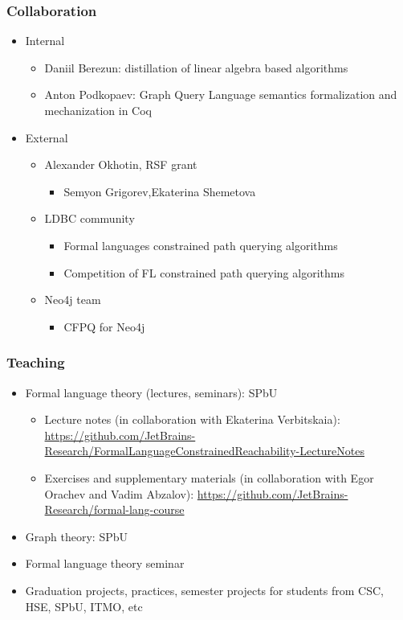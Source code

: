 \documentclass[xcolor=table, aspectratio=169]{beamer}
\begin{document}
\begin{frame}[fragile]

  \frametitle{Collaboration}
\begin{itemize}
      \item Internal
      \begin{itemize}
        \item Daniil Berezun: distillation of linear algebra based algorithms
        \item Anton Podkopaev: Graph Query Language semantics formalization and mechanization in Coq
      \end{itemize}
      \item External
      \begin{itemize}
      \item Alexander Okhotin, RSF grant 
      \begin{itemize}
        \item Semyon Grigorev,Ekaterina Shemetova
      \end{itemize}
      \item LDBC community
      \begin{itemize}
        \item Formal languages constrained path querying algorithms
        \item Competition of FL constrained path querying algorithms 
      \end{itemize}
      \item Neo4j team
      \begin{itemize}
        \item CFPQ for Neo4j
      \end{itemize}
    \end{itemize}

\end{itemize}
\end{frame}

\begin{frame}[fragile]

  \frametitle{Teaching}
\begin{itemize}
      \item Formal language theory (lectures, seminars): SPbU
        \begin{itemize}
          \item [\faGears] Lecture notes (in collaboration with Ekaterina Verbitskaia): \url{https://github.com/JetBrains-Research/FormalLanguageConstrainedReachability-LectureNotes} 
          \item [\faGears] Exercises and supplementary materials (in collaboration with Egor Orachev and Vadim Abzalov): \url{https://github.com/JetBrains-Research/formal-lang-course}
        \end{itemize}
      \item Graph theory: SPbU
      \item Formal language theory seminar
      \item Graduation projects, practices, semester projects for students from CSC, HSE, SPbU, ITMO, etc
\end{itemize}
\end{frame}
\end{document}
